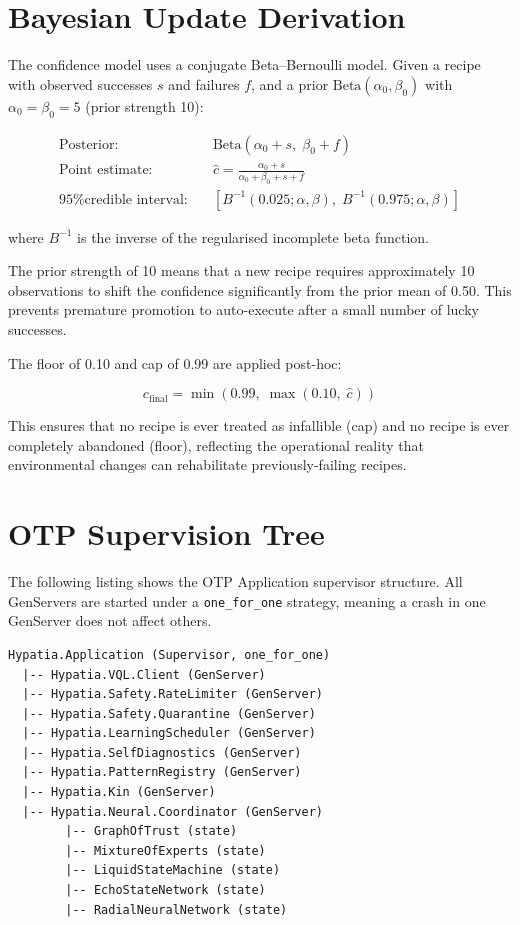 \documentclass[11pt,a4paper]{article}
\begin{document}
\section{Bayesian Update Derivation}
\label{app:bayesian}

The confidence model uses a conjugate Beta--Bernoulli model. Given a recipe with observed successes $s$ and failures $f$, and a prior $\text{Beta}(\alpha_0, \beta_0)$ with $\alpha_0 = \beta_0 = 5$ (prior strength 10):

\begin{align}
\text{Posterior:} \quad & \text{Beta}(\alpha_0 + s, \; \beta_0 + f) \label{eq:posterior} \\
\text{Point estimate:} \quad & \hat{c} = \frac{\alpha_0 + s}{\alpha_0 + \beta_0 + s + f} \label{eq:point_est} \\
\text{95\% credible interval:} \quad & \left[ B^{-1}(0.025; \alpha, \beta), \; B^{-1}(0.975; \alpha, \beta) \right] \label{eq:credible}
\end{align}

\noindent where $B^{-1}$ is the inverse of the regularised incomplete beta function.

The prior strength of 10 means that a new recipe requires approximately 10 observations to shift the confidence significantly from the prior mean of 0.50. This prevents premature promotion to auto-execute after a small number of lucky successes.

The floor of 0.10 and cap of 0.99 are applied post-hoc:

\begin{equation}
c_{\text{final}} = \min(0.99, \; \max(0.10, \; \hat{c}))
\label{eq:clamp}
\end{equation}

This ensures that no recipe is ever treated as infallible (cap) and no recipe is ever completely abandoned (floor), reflecting the operational reality that environmental changes can rehabilitate previously-failing recipes.


\section{OTP Supervision Tree}
\label{app:otp}

The following listing shows the OTP Application supervisor structure. All GenServers are started under a \texttt{one\_for\_one} strategy, meaning a crash in one GenServer does not affect others.

\begin{lstlisting}[language={},caption={OTP supervision tree (simplified).}]
Hypatia.Application (Supervisor, one_for_one)
  |-- Hypatia.VQL.Client (GenServer)
  |-- Hypatia.Safety.RateLimiter (GenServer)
  |-- Hypatia.Safety.Quarantine (GenServer)
  |-- Hypatia.LearningScheduler (GenServer)
  |-- Hypatia.SelfDiagnostics (GenServer)
  |-- Hypatia.PatternRegistry (GenServer)
  |-- Hypatia.Kin (GenServer)
  |-- Hypatia.Neural.Coordinator (GenServer)
        |-- GraphOfTrust (state)
        |-- MixtureOfExperts (state)
        |-- LiquidStateMachine (state)
        |-- EchoStateNetwork (state)
        |-- RadialNeuralNetwork (state)
\end{lstlisting}
\end{document}
